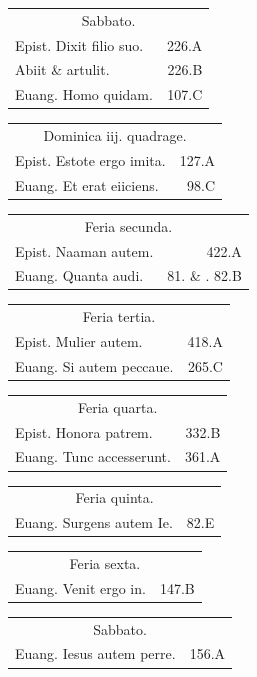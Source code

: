 \documentclass[a5paper,10pt]{book}
\begin{document}
\begin{multicols*}{2}
\begin{tabular}{l r}
\multicolumn{2}{c}{\color{red} Sabbato.}\\
Epist. Dixit filio suo. & 226.A\\
Abiit \& artulit. & 226.B\\
Euang. Homo quidam. & 107.C\\
\end{tabular}
\begin{tabular}{l r}
\multicolumn{2}{c}{\color{red} Dominica iij. quadrage.}\\
Epist. Estote ergo imita. & 127.A\\
Euang. Et erat eiiciens. & 98.C\\
\end{tabular}
\begin{tabular}{l r}
\multicolumn{2}{c}{\color{red} Feria secunda.}\\
Epist. Naaman autem. & 422.A\\
Euang. Quanta audi. & 81. \& . 82.B\\
\end{tabular}
\begin{tabular}{l r}
\multicolumn{2}{c}{\color{red} Feria tertia.}\\
Epist. Mulier autem. & 418.A\\
Euang. Si autem peccaue. & 265.C\\
\end{tabular}
\begin{tabular}{l r}
\multicolumn{2}{c}{\color{red} Feria quarta.}\\
Epist. Honora patrem. & 332.B\\
Euang. Tunc accesserunt. & 361.A\\
\end{tabular}
\begin{tabular}{l r}
\multicolumn{2}{c}{\color{red} Feria quinta.}\\
Euang. Surgens autem Ie. & 82.E\\
\end{tabular}
\begin{tabular}{l r}
\multicolumn{2}{c}{\color{red} Feria sexta.}\\
Euang. Venit ergo in. & 147.B\\
\end{tabular}
\begin{tabular}{l r}
\multicolumn{2}{c}{\color{red} Sabbato.}\\
Euang. Iesus autem perre. & 156.A\\
\end{tabular}

\end{multicols*}
\end{document}
